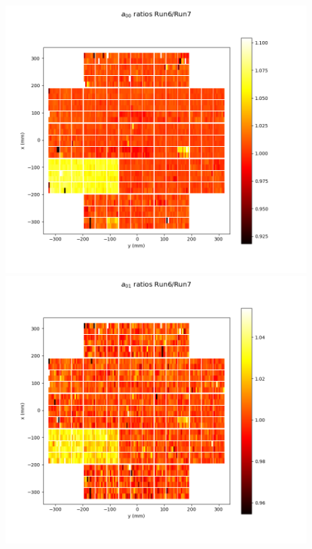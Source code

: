 \begin{figure}[H]
  \begin{centering}
  \includegraphics[width=\linewidth]{figures/baselineCharacterization/a00_ratios.png}
  \endminipage\hfill
  \includegraphics[width=\linewidth]{figures/baselineCharacterization/a01_ratios.png}
  \endminipage\hfill

\end{centering}
\end{figure}
